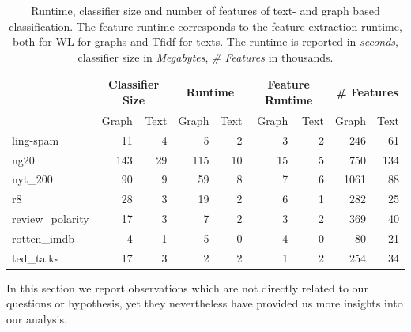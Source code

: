 \begin{table}[htb!]
	\centering
	\begin{tabular}{lrrrrrrrr}
		& \multicolumn{2}{c}{Classifier Size} &  \multicolumn{2}{c}{Runtime} &  \multicolumn{2}{c}{Feature Runtime} &  \multicolumn{2}{c}{\# Features} \\
		\midrule
		&  Graph &  Text &  Graph &  Text & Graph &  Text  & Graph &  Text \\
		\midrule
ling-spam       & 11 & 4 & 5 & 2 & 3 & 2 & 246 & 61 \\
ng20            & 143 & 29 & 115 & 10 & 15 & 5 & 750 & 134 \\
nyt\_200         & 90 & 9 & 59 & 8 & 7 & 6 & 1061 & 88 \\
r8              & 28 & 3 & 19 & 2 & 6 & 1 & 282 & 25 \\
review\_polarity & 17 & 3 & 7 & 2 & 3 & 2 & 369 & 40 \\
rotten\_imdb     & 4 & 1 & 5 & 0 & 4 & 0 & 80 & 21 \\
ted\_talks       & 17 & 3 & 2 & 2 & 1 & 2 & 254 & 34 \\
		\bottomrule
	\end{tabular}
\caption[Table: Runtime, classifier size and \# features for graph- and text based classification.]{
	Runtime, classifier size and number of features of text- and graph based classification.
	The feature runtime corresponds to the feature extraction runtime, both for WL for graphs and Tfidf for texts.
	The runtime is reported in \textit{seconds}, classifier size in \textit{Megabytes}, \textit{\# Features} in thousands.
}
\label{table:runtime_and_classifier_size}
\end{table}



In this section we report observations which are not directly related to our questions or hypothesis, yet they nevertheless have provided us more insights into our analysis.

